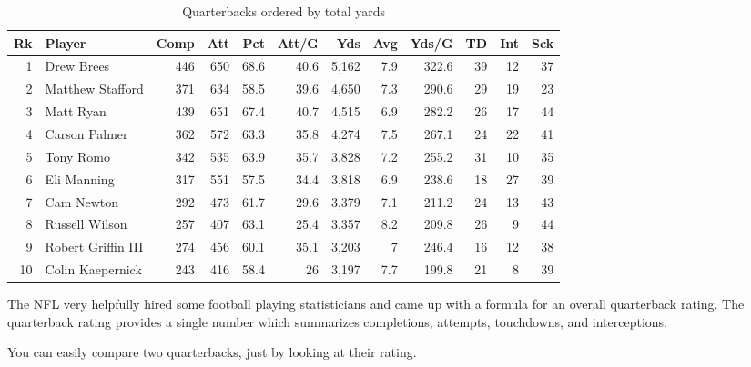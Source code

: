 \documentclass[fleqn, onecolumn]{article}
\begin{document}
  \begin{table}[H]
    \centering
    \begin{tabular}{rlrrrrrrrrrr}
      \toprule
      Rk & Player             & Comp & Att & Pct  & Att/G & Yds   & Avg & Yds/G & TD & Int & Sck \\
      \midrule 
      1  & Drew Brees         & 446  & 650 & 68.6 & 40.6  & 5,162 & 7.9 & 322.6 & 39 & 12  & 37   \\
      2  & Matthew Stafford   & 371  & 634 & 58.5 & 39.6  & 4,650 & 7.3 & 290.6 & 29 & 19  & 23  \\
      3  & Matt Ryan          & 439  & 651 & 67.4 & 40.7  & 4,515 & 6.9 & 282.2 & 26 & 17  & 44  \\
      4  & Carson Palmer      & 362  & 572 & 63.3 & 35.8  & 4,274 & 7.5 & 267.1 & 24 & 22  & 41  \\
      5  & Tony Romo          & 342  & 535 & 63.9 & 35.7  & 3,828 & 7.2 & 255.2 & 31 & 10  & 35  \\
      6  & Eli Manning        & 317  & 551 & 57.5 & 34.4  & 3,818 & 6.9 & 238.6 & 18 & 27  & 39  \\
      7  & Cam Newton         & 292  & 473 & 61.7 & 29.6  & 3,379 & 7.1 & 211.2 & 24 & 13  & 43  \\
      8  & Russell Wilson     & 257  & 407 & 63.1 & 25.4  & 3,357 & 8.2 & 209.8 & 26 & 9   & 44   \\
      9  & Robert Griffin III & 274  & 456 & 60.1 & 35.1  & 3,203 & 7   & 246.4 & 16 & 12  & 38  \\
      10 & Colin Kaepernick   & 243  & 416 & 58.4 & 26    & 3,197 & 7.7 & 199.8 & 21 & 8   & 39  \\
      \bottomrule 
    \end{tabular}
    \caption{Quarterbacks ordered by total yards}
  \end{table}

  The NFL very helpfully hired some football playing statisticians and came up with a formula for an overall quarterback
  rating.  The quarterback rating provides a single number which summarizes completions, attempts, touchdowns, and
  interceptions.  

  You can easily compare two quarterbacks, just by looking at their rating.
\end{document}
